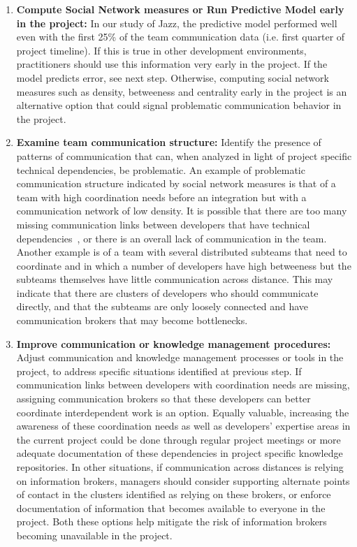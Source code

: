 \begin{enumerate}
\item \textbf{Compute Social Network measures or Run Predictive Model early in
the project:} In our study of Jazz, the predictive model performed well even
with the first 25\% of the team communication data (i.e. first quarter of
project timeline). If this is true in other development environments,
practitioners should use this information very early in the project. If the
model predicts error, see next step. Otherwise, computing social network measures such as
density, betweeness and centrality early in the project is an alternative
option that could signal problematic communication behavior in the project.
\item \textbf{Examine team communication structure:}
Identify the presence of patterns of communication that can, when analyzed in
light of project specific technical dependencies, be problematic. An example of
problematic communication structure indicated by social network
measures is that of a team with high coordination needs before an integration
but with a communication network of low density. It is possible that there are too many missing communication links between developers that have
technical dependencies~\cite{ehrlich2008:gaps}, or
there is an overall lack of communication in the team. Another example is of a team with several
distributed subteams that need to coordinate and in which a number of
developers have high betweeness but the subteams themselves have little
communication across distance. This may indicate that there are
clusters of developers who should communicate directly, and that
the subteams are only loosely connected and have communication brokers that
may become bottlenecks. 
\item \textbf{Improve communication or knowledge management
procedures:} Adjust communication and knowledge management processes or tools in
the project, to address specific situations identified at previous step. 
If communication links between developers with
coordination needs are missing, assigning communication brokers so that
these developers can better coordinate interdependent work is an
option. Equally valuable, increasing the awareness of these coordination needs
as well as developers' expertise areas in the current project could be done
through regular project meetings or more adequate documentation of these dependencies in project specific knowledge repositories. In other situations, if
communication across distances is relying on information brokers, managers
should consider supporting alternate points of contact in the clusters
identified as relying on these brokers, or enforce documentation of information
that becomes available to everyone in the project. Both these options help
mitigate the risk of information brokers becoming unavailable in the project. 
\end{enumerate}

